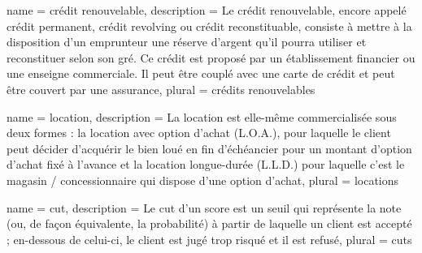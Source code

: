{
	name = crédit renouvelable,
	description = {Le crédit renouvelable, encore appelé crédit permanent, crédit revolving ou crédit reconstituable, consiste à mettre à la disposition d'un emprunteur une réserve d'argent qu'il pourra utiliser et reconstituer selon son gré. Ce crédit est proposé par un établissement financier ou une enseigne commerciale. Il peut être couplé avec une carte de crédit et peut être couvert par une assurance},
	plural = crédits renouvelables
}

{
	name = location,
	description = {La location est elle-même commercialisée sous deux formes : la location avec option d'achat (L.O.A.), pour laquelle le client peut décider d'acquérir le bien loué en fin d'échéancier pour un montant d'option d'achat fixé à l'avance et la location longue-durée (L.L.D.) pour laquelle c'est le magasin / concessionnaire qui dispose d'une option d'achat},
	plural = locations
}

{
	name = cut,
	description = {Le cut d'un score est un seuil qui représente la note (ou, de façon équivalente, la probabilité) à partir de laquelle un client est accepté ; en-dessous de celui-ci, le client est jugé trop risqué et il est refusé},
	plural = cuts
}










